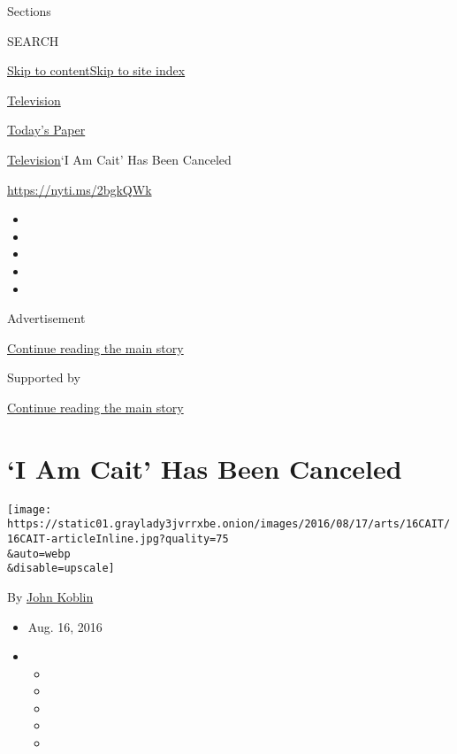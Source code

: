 Sections

SEARCH

\protect\hyperlink{site-content}{Skip to
content}\protect\hyperlink{site-index}{Skip to site index}

\href{https://www.nytimes3xbfgragh.onion/section/arts/television}{Television}

\href{https://myaccount.nytimes3xbfgragh.onion/auth/login?response_type=cookie\&client_id=vi}{}

\href{https://www.nytimes3xbfgragh.onion/section/todayspaper}{Today's
Paper}

\href{/section/arts/television}{Television}\textbar{}`I Am Cait' Has
Been Canceled

\url{https://nyti.ms/2bgkQWk}

\begin{itemize}
\item
\item
\item
\item
\item
\end{itemize}

Advertisement

\protect\hyperlink{after-top}{Continue reading the main story}

Supported by

\protect\hyperlink{after-sponsor}{Continue reading the main story}

\hypertarget{i-am-cait-has-been-canceled}{%
\section{`I Am Cait' Has Been
Canceled}\label{i-am-cait-has-been-canceled}}

\texttt{[image: https://static01.graylady3jvrrxbe.onion/images/2016/08/17/arts/16CAIT/16CAIT-articleInline.jpg?quality=75\\\&auto=webp\\\&disable=upscale]}

By \href{https://www.nytimes3xbfgragh.onion/by/john-koblin}{John Koblin}

\begin{itemize}
\item
  Aug. 16, 2016
\item
  \begin{itemize}
  \item
  \item
  \item
  \item
  \item
  \end{itemize}
\end{itemize}

